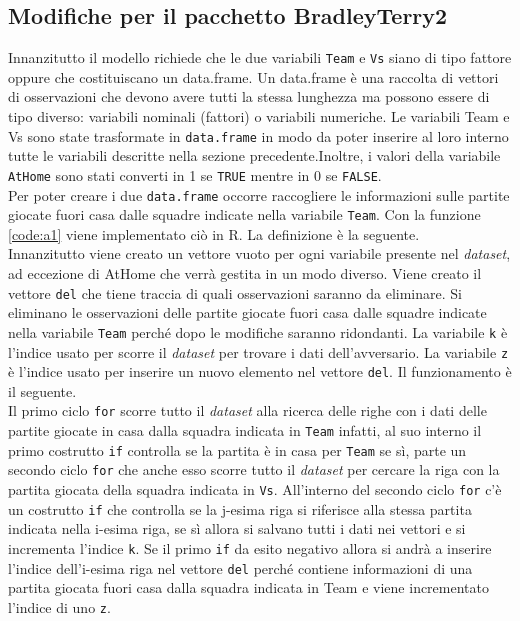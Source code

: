 \subsection{Modifiche per il pacchetto BradleyTerry2}
Innanzitutto il modello richiede che le due variabili \texttt{Team} e \texttt{Vs} siano di tipo fattore oppure che costituiscano un \textsf{data.frame}. Un \textsf{data.frame} è una raccolta di vettori di osservazioni che devono avere tutti la stessa lunghezza ma possono essere di tipo diverso: variabili nominali (fattori) o variabili numeriche.
Le variabili \textsf{Team} e \textsf{Vs} sono state trasformate in \texttt{data.frame} in modo da poter inserire al loro interno tutte le variabili descritte nella sezione precedente.Inoltre, i valori della variabile \texttt{AtHome} sono stati converti in 1 se \texttt{TRUE} mentre in 0 se \texttt{FALSE}.\\
Per poter creare i due \texttt{data.frame} occorre raccogliere le informazioni sulle partite giocate fuori casa dalle squadre indicate nella variabile \texttt{Team}. Con la funzione \ref{code:a1} viene implementato ciò in R. La definizione è la seguente.\\
Innanzitutto viene creato un vettore vuoto per ogni variabile presente nel \emph{dataset}, ad eccezione di \textsf{AtHome} che verrà gestita in un modo diverso. Viene creato il vettore \texttt{del} che tiene traccia di quali osservazioni saranno da eliminare. Si eliminano le osservazioni delle partite giocate fuori casa dalle squadre indicate nella variabile \texttt{Team} perché dopo le modifiche saranno ridondanti. La variabile \texttt{k} è l'indice usato per scorre il \emph{dataset} per trovare i dati dell'avversario. La variabile \texttt{z} è l'indice usato per inserire un nuovo elemento nel vettore \texttt{del}. Il funzionamento è il seguente.\\
Il primo ciclo \texttt{for} scorre tutto il \emph{dataset} alla ricerca delle righe con i dati delle partite giocate in casa dalla squadra indicata in \texttt{Team} infatti, al suo interno il primo costrutto \texttt{if} controlla se la partita è in casa per \texttt{Team} se sì, parte un secondo ciclo \texttt{for} che anche esso scorre tutto il \emph{dataset} per cercare la riga con la partita giocata della squadra indicata in \texttt{Vs}. All'interno del secondo ciclo \texttt{for} c'è un costrutto \texttt{if} che controlla se la j-esima riga si riferisce alla stessa partita indicata nella i-esima riga, se sì allora si salvano tutti i dati nei vettori e si incrementa l'indice \texttt{k}. Se il primo \texttt{if} da esito negativo allora si andrà a inserire l'indice dell'i-esima riga nel vettore \texttt{del} perché contiene informazioni di una partita giocata fuori casa dalla squadra indicata in \textsf{Team} e viene incrementato l'indice di uno \texttt{z}.\\
